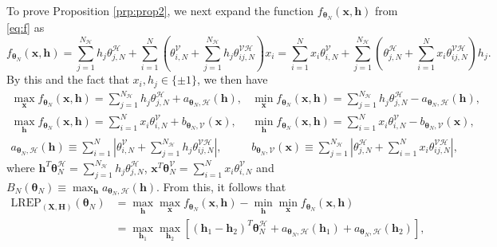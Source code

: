 \documentclass[]{article}
\theoremstyle{definition}
\newcommand{\REP}{\mathrm{LREP}}
\newcommand{\Gam}{B_{N}(\boldsymbol \theta_N) }
\begin{document}
To prove Proposition \ref{prp:prop2}, we next expand the function
\(f_{\boldsymbol \theta_N} (\boldsymbol x, \boldsymbol h)\) from
\eqref{eq:f} as \[
f_{\boldsymbol \theta_N} (\boldsymbol x, \boldsymbol h)= \sum_{j=1}^{N_\mathcal{H}} h_j \theta_{j,N}^{\mathcal{H}}  +   \sum_{i=1}^N \left( \theta_{i,N}^{\mathcal{V}} + \sum_{j=1}^{N_\mathcal{H}}  h_j  \theta_{ij,N}^{\mathcal{VH}}\right)x_i=\sum_{i=1}^N x_i  \theta_{i,N}^{\mathcal{V}} +  \sum_{j=1}^{N_\mathcal{H}} \left( \theta_{j,N}^{\mathcal{H}}  + \sum_{i=1}^N  x_i  \theta_{ij,N}^{\mathcal{VH}}\right)h_j.
\] By this and the fact that \(x_i,h_j\in\{\pm 1\}\), we then have
\begin{align}
\nonumber \max_{\boldsymbol x}  f_{\boldsymbol \theta_N} (\boldsymbol x, \boldsymbol h) =  \sum_{j=1}^{N_\mathcal{H}} h_j \theta_{j,N}^{\mathcal{H}}  +   a_{\boldsymbol \theta_N, \mathcal{H}} (\boldsymbol h), & \min_{\boldsymbol x}  f_{\boldsymbol \theta_N} (\boldsymbol x, \boldsymbol h) =  \sum_{j=1}^{N_\mathcal{H}} h_j \theta_{j,N}^{\mathcal{H}}  - a_{\boldsymbol \theta_N, \mathcal{H}} (\boldsymbol h),\\
\nonumber \max_{\boldsymbol h}  f_{\boldsymbol \theta_N} (\boldsymbol x, \boldsymbol h) = \sum_{i=1}^{N}x_i \theta_{i,N}^{\mathcal{V}} + b_{\boldsymbol \theta_N, \mathcal{V}} (\boldsymbol x), & \min_{\boldsymbol h}  f_{\boldsymbol \theta_N} (\boldsymbol x, \boldsymbol h) = \sum_{i=1}^{N}x_i \theta_{i,N}^{\mathcal{V}}  -   b_{\boldsymbol \theta_N, \mathcal{V}} (\boldsymbol x), \\ 
\label{eq:max}
a_{\boldsymbol \theta_N, \mathcal{H}} (\boldsymbol h) \equiv \sum_{i=1}^N \left| \theta_{i,N}^{\mathcal{V}} + \sum_{j=1}^{N_\mathcal{H}}  h_j  \theta_{ij,N}^{\mathcal{VH}}\right|, &  b_{\boldsymbol \theta_N, \mathcal{V}} (\boldsymbol x) \equiv \sum_{j=1}^{N_\mathcal{H}} \left| \theta_{j,N}^{\mathcal{H}}  + \sum_{i=1}^N  x_i  \theta_{ij,N}^{\mathcal{VH}}\right|,
\end{align}
where
\(\boldsymbol h^T \boldsymbol \theta_N^{\mathcal{H}}=\sum_{j=1}^{N_\mathcal{H}} h_j \theta_{j,N}^{\mathcal{H}}\),
\(\boldsymbol x^T \boldsymbol \theta_N^{\mathcal{V}}= \sum_{i=1}^{N}x_i \theta_{i,N}^{\mathcal{V}}\)
and
\(\Gam\equiv \max_{\boldsymbol h} a_{\boldsymbol \theta_N, \mathcal{H}} (\boldsymbol h)\).
From this, it follows that
\begin{align*}
\REP_{(\boldsymbol X, \boldsymbol H)}(\boldsymbol \theta_N) &=  \max_{\boldsymbol h}\max_{\boldsymbol x}f_{\boldsymbol \theta_N} (\boldsymbol x , \boldsymbol h) -  \min_{\boldsymbol h}\min_{\boldsymbol x}f_{\boldsymbol \theta_N} (\boldsymbol x , \boldsymbol h)\\
&= \max_{\boldsymbol h_1 }  \max_{\boldsymbol h_2 }\left[ (\boldsymbol h_1 - \boldsymbol h_2)^T \boldsymbol \theta_N^{\mathcal{H}}  +   a_{\boldsymbol \theta_N, \mathcal{H}} (\boldsymbol h_1)  + a_{\boldsymbol \theta_N, \mathcal{H}} (\boldsymbol h_2)\right],
\end{align*}
\end{document}
